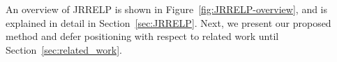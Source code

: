 An overview of JRRELP is shown in Figure~\ref{fig:JRRELP-overview}, and is explained in detail in Section~\ref{sec:JRRELP}.
Next, we present our proposed method and defer positioning with respect to related work until Section~\ref{sec:related_work}.
